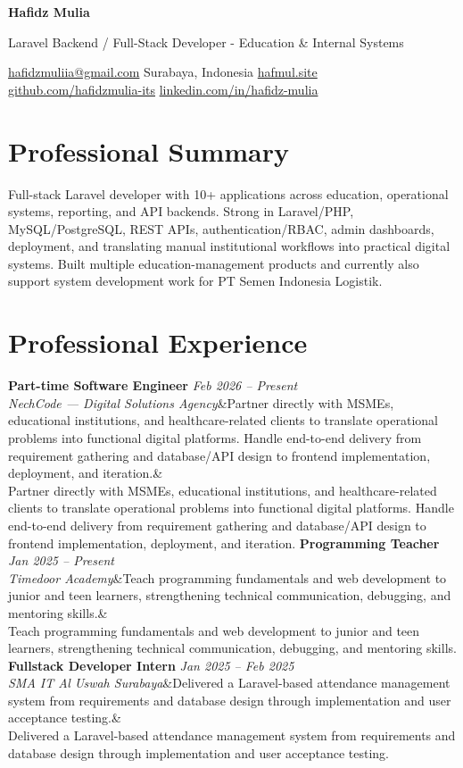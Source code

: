 \documentclass[a4paper,10.5pt]{article}
\newcommand{\cvname}[1]{{\centering\LARGE\bfseries #1\par\vspace{1pt}}}
\newcommand{\cvtitle}[1]{{\centering\normalsize\color{accent} #1\par\vspace{2pt}}}
\newcommand{\cvcontact}[1]{{\centering\small #1\par\vspace{4pt}}}
\newcommand{\cventry}[4]{\noindent\textbf{#1} \hfill \textit{#3} \\\textit{#2}\ifx&#4& \else \\ {\small #4} \fi\vspace{4pt}}
\begin{document}
\cvname{Hafidz Mulia}
\cvtitle{Laravel Backend / Full-Stack Developer - Education \& Internal Systems}
\cvcontact{\href{mailto:hafidzmuliia@gmail.com}{hafidzmuliia@gmail.com} \quad\textbar\quad Surabaya, Indonesia \quad\textbar\quad \href{https://hafmul.site}{hafmul.site} \\
\href{https://github.com/hafidzmulia-its}{github.com/hafidzmulia-its} \quad\textbar\quad \href{https://www.linkedin.com/in/hafidz-mulia/}{linkedin.com/in/hafidz-mulia}}

\section{Professional Summary}
Full-stack Laravel developer with 10+ applications across education, operational systems, reporting, and API backends. Strong in Laravel/PHP, MySQL/PostgreSQL, REST APIs, authentication/RBAC, admin dashboards, deployment, and translating manual institutional workflows into practical digital systems. Built multiple education-management products and currently also support system development work for PT Semen Indonesia Logistik.

\section{Professional Experience}
\cventry{Part-time Software Engineer}{NechCode --- Digital Solutions Agency}{Feb 2026 -- Present}{Partner directly with MSMEs, educational institutions, and healthcare-related clients to translate operational problems into functional digital platforms. Handle end-to-end delivery from requirement gathering and database/API design to frontend implementation, deployment, and iteration.}
\cventry{Programming Teacher}{Timedoor Academy}{Jan 2025 -- Present}{Teach programming fundamentals and web development to junior and teen learners, strengthening technical communication, debugging, and mentoring skills.}
\cventry{Fullstack Developer Intern}{SMA IT Al Uswah Surabaya}{Jan 2025 -- Feb 2025}{Delivered a Laravel-based attendance management system from requirements and database design through implementation and user acceptance testing.}
\end{document}
